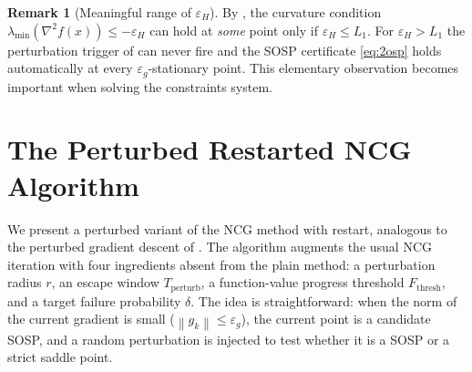 \documentclass[11pt,a4paper]{article}
\theoremstyle{plain}
\theoremstyle{definition}
\newtheorem{remark}{Remark}
\newcommand{\norm}[1]{\left\|#1\right\|}
\newcommand{\eps}{\varepsilon}
\newcommand{\epsg}{\eps_{g}}
\newcommand{\epsH}{\eps_{H}}
\newcommand{\hess}{\nabla^{2}}
\newcommand{\Lone}{L_{1}}
\newcommand{\Tp}{T_{\mathrm{perturb}}}
\newcommand{\Fthresh}{F_{\mathrm{thresh}}}
\begin{document}
\begin{remark}[Meaningful range of $\epsH$]\label{rem:epsH-range}
By , the curvature condition
$\lambda_{\min}(\hess f(x)) \le -\epsH$ can hold at \emph{some} point only if
$\epsH \le \Lone$. For $\epsH > \Lone$ the perturbation trigger of
 can never fire and the SOSP certificate \eqref{eq:2osp} holds
automatically at every $\epsg$-stationary point. This elementary observation
becomes important when solving the constraints system.
\end{remark}

\section{The Perturbed Restarted NCG Algorithm}\label{sec:algo}

We present a perturbed variant of the NCG method with
restart, analogous to the perturbed gradient descent of \cite{pmlr-v70-jin17a}. The
algorithm augments the usual NCG iteration with four ingredients absent from the plain
method: a perturbation radius $r$, an escape window $\Tp$, a function-value progress
threshold $\Fthresh$, and a target failure probability $\delta$. The idea is
straightforward: when the norm of the current gradient is small ($\norm{g_k} \leq
\epsg$), the current point is a candidate SOSP, and a random
perturbation is injected to test whether it is a SOSP or a
strict saddle point.
\end{document}

